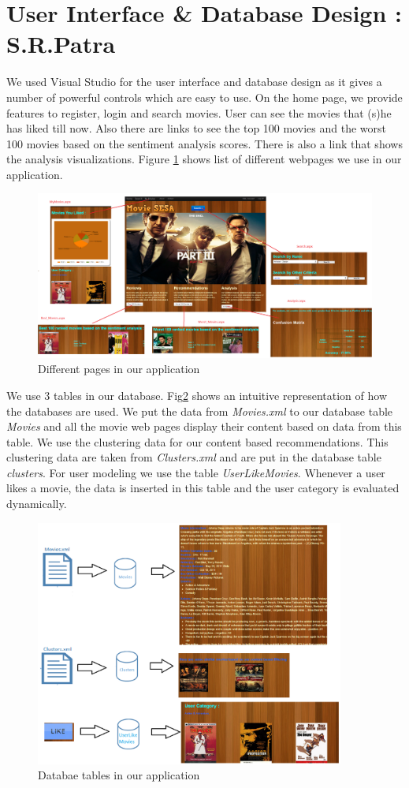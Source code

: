 \section{User Interface \& Database Design : S.R.Patra}
We used Visual Studio for the user interface and database design as it gives a number of powerful controls which are easy to use. On the home page, we provide features to register, login and search movies. User can see the movies that (s)he has liked till now. Also there are links to see the top 100 movies and the worst 100 movies based on the sentiment analysis scores. There is also a link that shows the analysis visualizations. Figure \ref{fig:home} 
shows list of different webpages we use in our application.
 
\begin{figure}[H]
    \centering
    \includegraphics[width=5.0in]{home.png}
    \caption{Different pages in our application}
    \label{fig:home}
\end{figure}

We use 3 tables in our database. Fig\ref{fig:database} shows an intuitive representation of how the databases are used. We put the data from \textit{Movies.xml} to our database table \textit{Movies} and all the movie web pages display their content based on data from this table. We use the clustering data for our content based recommendations. This clustering data are taken from \textit{Clusters.xml} and are put in the database table \textit{clusters}. For user modeling we use the table \textit{UserLikeMovies}. Whenever a user likes a movie, the data is inserted in this table and the user category is evaluated dynamically.
 
\begin{figure}[H]
    \centering
    \includegraphics[width=4.0in]{database.png}
    \caption{Databae tables in our application}
    \label{fig:database}
\end{figure}

